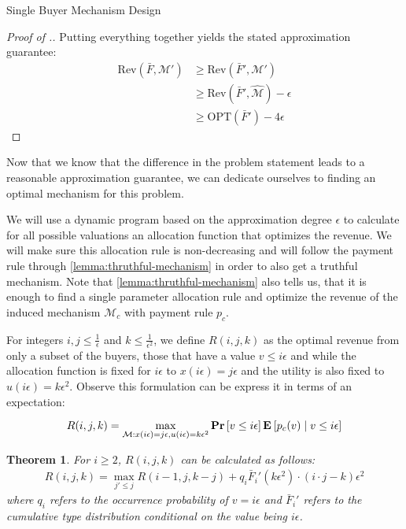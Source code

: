 \documentclass[11pt,a4paper]{article}
\newtheorem{theorem}{Theorem}
\renewcommand{\Pr}[1]{\mbox{\rm\bf Pr}\left[#1\right]}
\newcommand{\Ex}[2][]{\mbox{\rm\bf E}_{#1}\left[#2\right]}
\newcommand{\1}[1]{\mbox{\rm\bf 1}_{#1}}
\begin{document}
\begin{section}{Single Buyer Mechanism Design}
\begin{proof}[Proof of .]
     Putting everything together yields the stated approximation guarantee:
     \begin{align*}
         \mathrm{Rev}(\bar{F}, \mathcal{M}') & \geq \mathrm{Rev}(\bar{F}', \mathcal{M}')                     \\
                                             & \geq \mathrm{Rev}(\bar{F}', \widehat{\mathcal{M}}) - \epsilon \\
                                             & \geq \mathrm{OPT}(\bar{F}') - 4\epsilon
     \end{align*}
 \end{proof}

 Now that we know that the difference in the problem statement leads to a reasonable approximation guarantee,
 we can dedicate ourselves to finding an optimal mechanism for this problem.

 We will use a dynamic program based on the approximation degree $\epsilon$ to calculate for all possible valuations
 an allocation function that optimizes the revenue.
 We will make sure this allocation rule is non-decreasing and will follow the payment rule through \cref{lemma:thruthful-mechanism}
 in order to also get a truthful mechanism.
 Note that \cref{lemma:thruthful-mechanism} also tells us, that it is enough to find a single parameter allocation rule and optimize the revenue of the induced mechanism $\mathcal{M}_c$ with payment rule $p_c$.

 For integers $i,j \leq \frac{1}{\epsilon}$ and $k \leq \frac{1}{\epsilon^2}$,
 we define $R(i,j,k)$ as the optimal revenue from only a subset of the buyers, those that have a value $v \leq i \epsilon$
 and while the allocation function is fixed for $i\epsilon$ to $x(i \epsilon) = j \epsilon$ and the utility is also fixed to $u(i \epsilon) = k \epsilon^2$.
 Observe this formulation can be express it in terms of an expectation:

 \begin{equation}
     \label{eq:rijk}
     R(i,j,k) = \max_{\mathcal{M}: x(i\epsilon) = j\epsilon, u(i\epsilon) = k \epsilon^2} \Pr{v \leq i\epsilon}\Ex{p_c(v)\mid v \leq i \epsilon}
 \end{equation}

 \begin{theorem}
     \label{theorem:recursion-formular}
     For $i \geq 2$, $R(i,j,k)$ can be calculated as follows:
     \begin{align*}
         R(i,j,k) = \max_{j' \leq j} R(i-1, j, k - j) + q_i \bar{F}_i'(k \epsilon^2) \cdot (i\cdot j - k)\epsilon^2
     \end{align*}
     where $q_i$ refers to the occurrence probability of $v = i \epsilon$ and $\bar{F}_i'$ refers to the cumulative type distribution conditional on the value being $i\epsilon$.
 \end{theorem}


\end{section}
\end{document}
